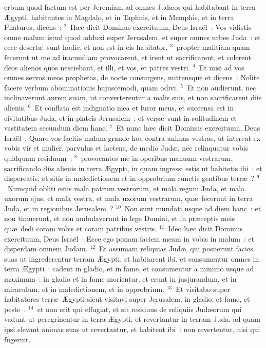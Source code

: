 \bchapter
{}erbum quod factum est per Jeremiam ad omnes Jud\ae os qui habitabant in terra \AE gypti, habitantes in Magdalo, et in Taphnis, et in Memphis, et in terra Phatures, dicens~:
${}^{2}$~H\ae c dicit Dominus exercituum, Deus Isra\"el~: Vos vidistis omne malum istud quod adduxi super Jerusalem, et super omnes urbes Juda~: et ecce desert\ae\ sunt hodie, et non est in eis habitator,
${}^{3}$~propter malitiam quam fecerunt ut me ad iracundiam provocarent, et irent ut sacrificarent, et colerent deos alienos quos nesciebant, et illi, et vos, et patres vestri.
${}^{4}$~Et misi ad vos omnes servos meos prophetas, de nocte consurgens, mittensque et dicens~: Nolite facere verbum abominationis hujuscemodi, quam odivi.
${}^{5}$~Et non audierunt, nec inclinaverunt aurem suam, ut converterentur a malis suis, et non sacrificarent diis alienis.
${}^{6}$~Et conflata est indignatio mea et furor meus, et succensa est in civitatibus Juda, et in plateis Jerusalem~: et vers\ae\ sunt in solitudinem et vastitatem secundum diem hanc.
${}^{7}$~Et nunc h\ae c dicit Dominus exercituum, Deus Isra\"el~: Quare vos facitis malum grande hoc contra animas vestras, ut intereat ex vobis vir et mulier, parvulus et lactens, de medio Jud\ae , nec relinquatur vobis quidquam residuum~:
${}^{8}$~provocantes me in operibus manuum vestrarum, sacrificando diis alienis in terra \AE gypti, in quam ingressi estis ut habitetis ibi~: et dispereatis, et sitis in maledictionem et in opprobrium cunctis gentibus terr\ae~?
${}^{9}$~Numquid obliti estis mala patrum vestrorum, et mala regum Juda, et mala uxorum ejus, et mala vestra, et mala uxorum vestrarum, qu\ae\ fecerunt in terra Juda, et in regionibus Jerusalem~?
${}^{10}$~Non sunt mundati usque ad diem hanc~: et non timuerunt, et non ambulaverunt in lege Domini, et in pr\ae ceptis meis qu\ae\ dedi coram vobis et coram patribus vestris.
${}^{11}$~Ideo h\ae c dicit Dominus exercituum, Deus Isra\"el~: Ecce ego ponam faciem meam in vobis in malum~: et disperdam omnem Judam.
${}^{12}$~Et assumam reliquias Jud\ae , qui posuerunt facies suas ut ingrederentur terram \AE gypti, et habitarent ibi, et consumentur omnes in terra \AE gypti~: cadent in gladio, et in fame, et consumentur a minimo usque ad maximum~: in gladio et in fame morientur, et erunt in jusjurandum, et in miraculum, et in maledictionem, et in opprobrium.
${}^{13}$~Et visitabo super habitatores terr\ae\ \AE gypti sicut visitavi super Jerusalem, in gladio, et fame, et peste~:
${}^{14}$~et non erit qui effugiat, et sit residuus de reliquiis Jud\ae orum qui vadunt ut peregrinentur in terra \AE gypti, et revertantur in terram Juda, ad quam ipsi elevant animas suas ut revertantur, et habitent ibi~: non revertentur, nisi qui fugerint.


